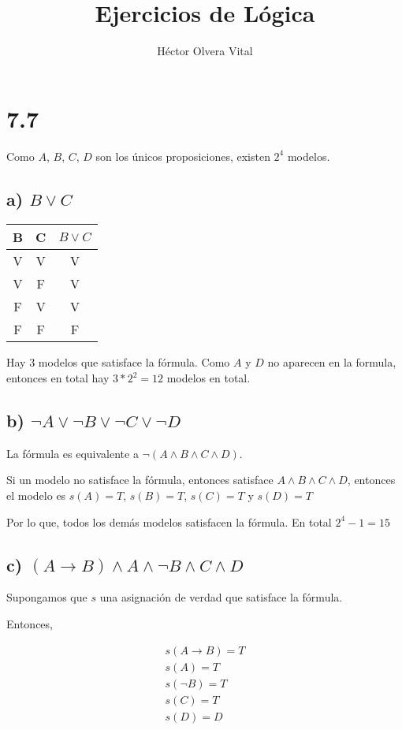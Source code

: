\documentclass[spanish]{article}
\title{Ejercicios de Lógica}
\author{Héctor Olvera Vital}
\begin{document}
\maketitle


\section*{7.7}
Como $A$, $B$, $C$, $D$ son los únicos proposiciones, existen $2^4$ modelos.

\subsection*{a) $B \vee C$}

\begin{tabular}{c|c|c}
  B & C & $B \vee C$ \\\hline
  V & V & V          \\
  V & F & V          \\
  F & V & V          \\
  F & F & F
\end{tabular}

Hay 3 modelos que satisface la fórmula. Como $A$ y $D$ no aparecen en la formula, entonces en total hay $3*2^2=12$ modelos en total.

\subsection*{ b) $\neg A \vee \neg B \vee \neg C \vee \neg D$}

La fórmula es equivalente a $\neg (A \wedge B \wedge C \wedge D)$.

Si un modelo no satisface la fórmula, entonces satisface $A\wedge B\wedge C\wedge D$, entonces el modelo es $s(A)=T$, $s(B)=T$, $s(C)=T$ y $s(D)=T$

Por lo que, todos los demás modelos satisfacen la fórmula. En total $2^4 -1 = 15$

\subsection*{ c) $(A \rightarrow B)\wedge A \wedge \neg B \wedge C \wedge D$}

Supongamos que $s$ una asignación de verdad que satisface la fórmula.

Entonces,

\begin{align*}
  s(A \rightarrow B) = T \\
  s(A) = T               \\
  s(\neg B) = T          \\
  s(C) = T               \\
  s(D) = D
\end{align*}
\end{document}
